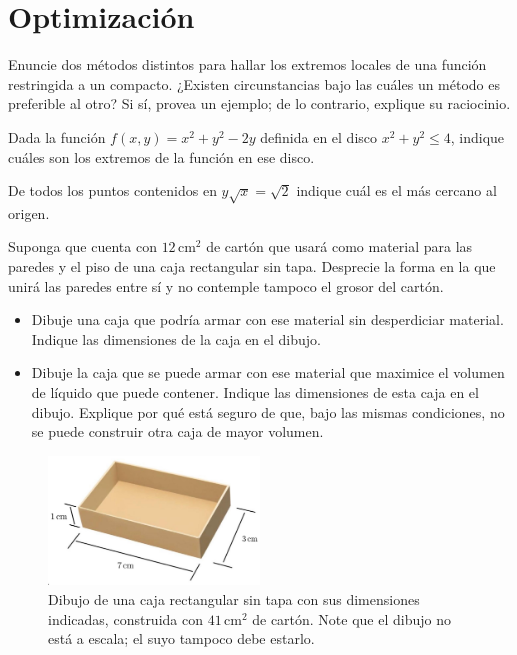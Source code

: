 \documentclass{fmbvecto}
\begin{document}
\section{Optimización}

\begin{enumerate}
    \setcounter{enumi}{9}
    \itemp[\(0.\bar{3}\)]  Enuncie dos métodos distintos para hallar los extremos locales de una función restringida a un compacto. ¿Existen circunstancias bajo las cuáles un método es preferible al otro? Si sí, provea un ejemplo; de lo contrario, explique su raciocinio.
    
    \itemp[\(0.\bar{3}\)]  Dada la función \(f(x,y)=x^2+y^2-2y\) definida en el disco \(x^2+y^2\leq 4\), indique cuáles son los extremos de la función en ese disco. 
    
    \itemp[\(0.\bar{3}\)]  De todos los puntos contenidos en \(y\sqrt{x} = \sqrt{2}\) indique cuál es el más cercano al origen.

    
    \itemp[\(0.\bar{3}\)] Suponga que cuenta con \(12 \, \mathrm{cm}^2 \) de cartón que usará como material para las paredes y el piso de una caja rectangular sin tapa. Desprecie la forma en la que unirá las paredes entre sí y no contemple tampoco el grosor del cartón.
    \begin{itemize}
        \item Dibuje una caja que podría armar con ese material sin desperdiciar material. Indique las dimensiones de la caja en el dibujo.
        \item Dibuje la caja que se puede armar con ese material que maximice el volumen de líquido que puede contener. Indique las dimensiones de esta caja en el dibujo. Explique por qué está seguro de que, bajo las mismas condiciones, no se puede construir otra caja de mayor volumen.
    \end{itemize}
    \begin{figure}[H]
        \centering
        \includegraphics[width=0.5\textwidth]{caja.png}
        \caption{Dibujo de una caja rectangular sin tapa con sus dimensiones indicadas, construida con \(41 \, \mathrm{cm}^2 \) de cartón. Note que el dibujo no está a escala; el suyo tampoco debe estarlo.}
    \end{figure}
        
        
\end{enumerate}
\end{document}
